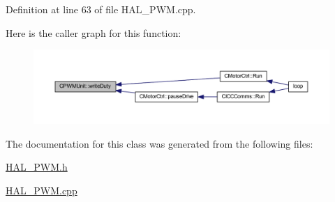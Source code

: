 Definition at line 63 of file H\+A\+L\+\_\+\+P\+W\+M.\+cpp.

Here is the caller graph for this function\+:
\nopagebreak
\begin{figure}[H]
\begin{center}
\leavevmode
\includegraphics[width=350pt]{class_c_p_w_m_unit_a60f8be5eabf779f57e6392a0432bf7f2_icgraph}
\end{center}
\end{figure}


The documentation for this class was generated from the following files\+:\begin{DoxyCompactItemize}
\item 
\mbox{\hyperlink{_h_a_l___p_w_m_8h}{H\+A\+L\+\_\+\+P\+W\+M.\+h}}\item 
\mbox{\hyperlink{_h_a_l___p_w_m_8cpp}{H\+A\+L\+\_\+\+P\+W\+M.\+cpp}}\end{DoxyCompactItemize}
